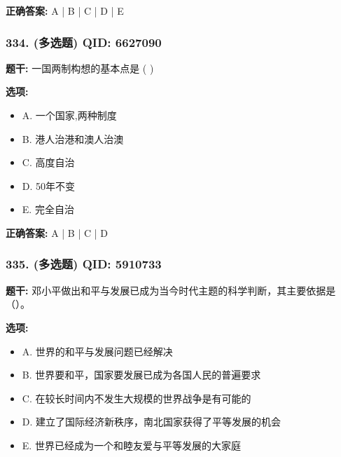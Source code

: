 \documentclass[12pt,UTF8]{ctexart}
\begin{document}
\textbf{正确答案:}
A | B | C | D | E

\vspace{0.3em}\hrulefill\vspace{0.7em}

\subsubsection*{334. (多选题) \small QID: 6627090}

\textbf{题干:}
一国两制构想的基本点是  ( )

\textbf{选项:}
\begin{itemize}[leftmargin=*]

  \item A. 一个国家,两种制度

  \item B. 港人治港和澳人治澳

  \item C. 高度自治

  \item D. 50年不变

  \item E. 完全自治

\end{itemize}

\textbf{正确答案:}
A | B | C | D

\vspace{0.3em}\hrulefill\vspace{0.7em}

\subsubsection*{335. (多选题) \small QID: 5910733}

\textbf{题干:}
邓小平做出和平与发展已成为当今时代主题的科学判断，其主要依据是（）。

\textbf{选项:}
\begin{itemize}[leftmargin=*]

  \item A. 世界的和平与发展问题已经解决

  \item B. 世界要和平，国家要发展已成为各国人民的普遍要求

  \item C. 在较长时间内不发生大规模的世界战争是有可能的

  \item D. 建立了国际经济新秩序，南北国家获得了平等发展的机会

  \item E. 世界已经成为一个和睦友爱与平等发展的大家庭

\end{itemize}
\end{document}
